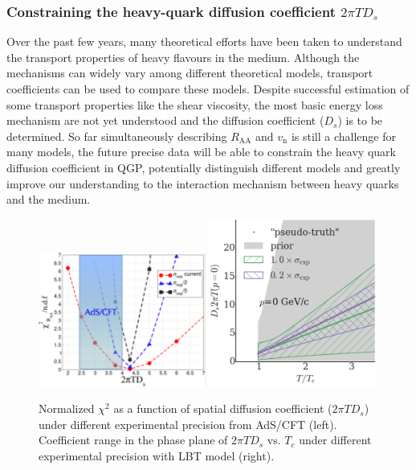 \subsubsection{Constraining the heavy-quark diffusion coefficient $2\pi TD_s$}

Over the past few years, many theoretical efforts have been taken to understand the transport properties of heavy flavours in the medium. Although the mechanisms can widely vary among different theoretical models, transport coefficients can be used to compare these models. Despite successful estimation of some transport properties like the shear viscosity, the most basic energy loss mechanism are not yet understood and the diffusion coefficient ($D_{s}$) is to be determined. So far simultaneously describing $R_{\mathrm{AA}}$ and $v_{\mathrm{n}}$ is still a challenge for many models, the future precise data will be able to constrain the heavy quark diffusion coefficient in QGP, potentially distinguish different models and greatly improve our understanding to the interaction mechanism between heavy quarks and the medium.

\begin{figure}[ht]
  \begin{center}
    \includegraphics[width=0.49\textwidth]{hf/figures/Greco.pdf}
    \includegraphics[width=0.49\textwidth]{hf/figures/Plot_D2piT_posterior_p0.png}
    \caption{Normalized $\chi^{2}$ as a function of spatial diffusion coefficient ($2\pi TD_{s}$) under different experimental precision from AdS/CFT (left). Coefficient range in the phase plane of $2\pi TD_{s}$ vs. $T_{c}$ under different experimental precision with LBT model (right).}
    \label{fig:RAAv2.Dstheory}
  \end{center}
\end{figure}

